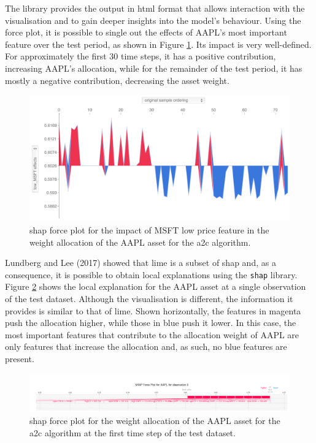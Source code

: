 The library provides the output in \acrfull{html} format that allows interaction with the visualisation and to gain deeper insights into the model's behaviour. Using the force plot, it is possible to single out the effects of AAPL's most important feature over the test period, as shown in Figure \ref{fig:a2c_shap_forceplot_aapl_lowmsft}. Its impact is very well-defined. For approximately the first 30 time steps, it has a positive contribution, increasing AAPL's allocation, while for the remainder of the test period, it has mostly a negative contribution, decreasing the asset weight.

\begin{figure}
    \centering
    \includegraphics[width=\textwidth]{figures/a2c_shap_forceplot_aapl_lowmsft.png}
    \caption{\acrshort{shap} force plot for the impact of MSFT low price feature in the weight allocation of the AAPL asset for the \acrshort{a2c} algorithm.}
    \label{fig:a2c_shap_forceplot_aapl_lowmsft}
\end{figure}

Lundberg and Lee (2017) \cite{Lundberg2017} showed that \acrshort{lime} is a subset of \acrshort{shap} and, as a consequence, it is possible to obtain local explanations using the \texttt{shap} library. Figure \ref{fig:a2c_shap_forceplot_singleobs_aapl} shows the local explanation for the AAPL asset at a single observation of the test dataset. Although the visualisation is different, the information it provides is similar to that of \acrshort{lime}. Shown horizontally, the features in magenta push the allocation higher, while those in blue push it lower. In this case, the most important features that contribute to the allocation weight of AAPL are only features that increase the allocation and, as such, no blue features are present.

\begin{figure}
    \centering
    \includegraphics[width=\textwidth]{figures/a2c_shap_forceplot_singleobs_aapl.png}
    \caption{\acrshort{shap} force plot for the weight allocation of the AAPL asset for the \acrshort{a2c} algorithm at the first time step of the test dataset.}
    \label{fig:a2c_shap_forceplot_singleobs_aapl}
\end{figure}